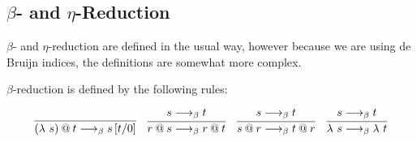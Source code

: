 \subsection{$\beta$- and $\eta$-Reduction}

$\beta$- and $\eta$-reduction are defined in the usual way, however because we are using de Bruijn indices, the definitions are somewhat more complex.

$\beta$-reduction is defined by the following rules:

\begin{align}
\infer{(\abstr{s}) \app t \longrightarrow_\beta \subst{s}{t}{0}}{} &&
\infer{r \app s \longrightarrow_\beta r \app t}{s \longrightarrow_\beta t} &&
\infer{s \app r \longrightarrow_\beta t \app r}{s \longrightarrow_\beta t} &&
\infer{\abstr{s} \longrightarrow_\beta \abstr{t}}{s \longrightarrow_\beta t}
\end{align}

